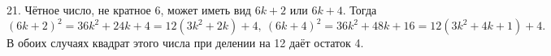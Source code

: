 21. Чётное число, не кратное 6, может иметь вид $6k+2$ или $6k+4.$ Тогда $(6k+2)^2=36k^2+24k+4=12(3k^2+2k)+4,\ (6k+4)^2=36k^2+48k+16=12(3k^2+4k+1)+4.$ В обоих случаях квадрат этого числа при делении на 12 даёт остаток 4.\\
